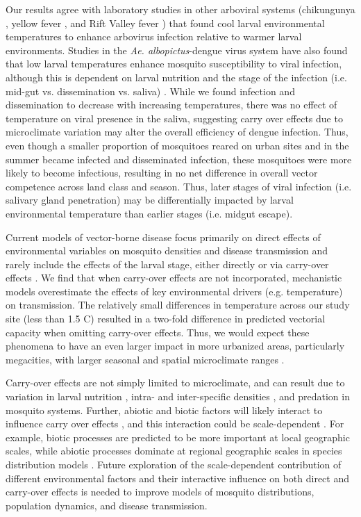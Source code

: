 \documentclass[12pt]{article}
\begin{document}
Our results agree with laboratory studies in other arboviral systems (chikungunya \citep{adelman2013}, yellow fever \citep{adelman2013}, and Rift Valley fever \citep{turell1993}) that found cool larval environmental temperatures to enhance arbovirus infection relative to warmer larval environments. Studies in the \textit{Ae. albopictus}-dengue virus system have also found that low larval temperatures enhance mosquito susceptibility to viral infection, although this is dependent on larval nutrition \citep{buckner2016} and the stage of the infection (i.e. mid-gut vs. dissemination vs. saliva) \citep{alto2013}. While we found infection and dissemination to decrease with increasing temperatures, there was no effect of temperature on viral presence in the saliva, suggesting carry over effects due to microclimate variation may alter the overall efficiency of dengue infection. Thus, even though a smaller proportion of mosquitoes reared on urban sites and in the summer became infected and disseminated infection, these mosquitoes were more likely to become infectious, resulting in no net difference in overall vector competence across land class and season. Thus, later stages of viral infection (i.e. salivary gland penetration) may be differentially impacted by larval environmental temperature than earlier stages (i.e. midgut escape).

Current models of vector-borne disease focus primarily on direct effects of environmental variables on mosquito densities and disease transmission and rarely include the effects of the larval stage, either directly or via carry-over effects \citep{reiner2013}. We find that when carry-over effects are not incorporated, mechanistic models overestimate the effects of key environmental drivers (e.g. temperature) on transmission. The relatively small differences in temperature across our study site (less than 1.5 \degree C) resulted in a two-fold difference in predicted vectorial capacity when omitting carry-over effects. Thus, we would expect these phenomena to have an even larger impact in more urbanized areas, particularly megacities, with larger seasonal and spatial microclimate ranges \citep{peng2012}.

Carry-over effects are not simply limited to microclimate, and can result due to variation in larval nutrition \citep{moller-jacobs2014}, intra- and inter-specific densities \citep{alto2005}, and predation \citep{roux2015a} in mosquito systems. Further, abiotic and biotic factors will likely interact to influence carry over effects \citep{buckner2016, muturi2012a}, and this interaction could be scale-dependent \citep{leisnham2014}. For example, biotic processes are predicted to be more important at local geographic scales, while abiotic processes dominate at regional geographic scales in species distribution models \citep{cohen2016}. Future exploration of the scale-dependent contribution of different environmental factors and their interactive influence on both direct and carry-over effects is needed to improve models of mosquito distributions, population dynamics, and disease transmission.
\end{document}

